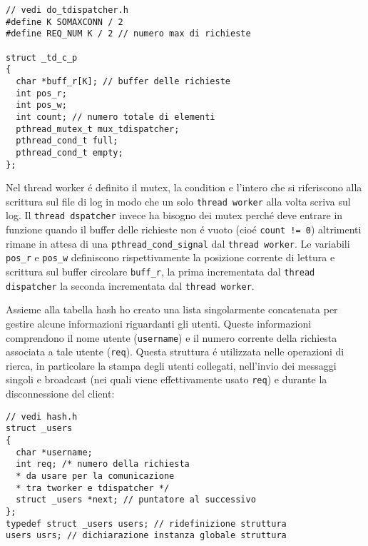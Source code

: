\documentclass[12pt a4paper oneside]{article}
\begin{document}
{\begin{verbatim}
// vedi do_tdispatcher.h
#define K SOMAXCONN / 2
#define REQ_NUM K / 2 // numero max di richieste

struct _td_c_p
{
  char *buff_r[K]; // buffer delle richieste
  int pos_r;
  int pos_w;
  int count; // numero totale di elementi
  pthread_mutex_t mux_tdispatcher;
  pthread_cond_t full;
  pthread_cond_t empty;
};
			\end{verbatim}
			Nel thread worker \'e definito il mutex, la condition e l'intero che si riferiscono alla scrittura sul file di log in modo che un solo \texttt{thread worker} alla volta scriva sul log. Il \texttt{thread dspatcher} invece ha bisogno dei mutex perch\'e deve entrare in funzione quando il buffer delle richieste non \'e vuoto (cio\'e \texttt{count != 0}) altrimenti rimane in attesa di una \texttt{pthread\_cond\_signal} dal \texttt{thread worker}. Le variabili \texttt{pos\_r} e \texttt{pos\_w} definiscono rispettivamente la posizione corrente di lettura e scrittura sul buffer circolare \texttt{buff\_r}, la prima incrementata dal \texttt{thread dispatcher} la seconda incrementata dal \texttt{thread worker}.
			\par
			Assieme alla tabella hash ho creato una lista singolarmente concatenata per gestire alcune informazioni riguardanti gli utenti. Queste informazioni comprendono il nome utente (\texttt{username}) e il numero corrente della richiesta associata a tale utente (\texttt{req}). Questa struttura \'e utilizzata nelle operazioni di rierca, in particolare la stampa degli utenti collegati, nell'invio dei messaggi singoli e broadcast (nei quali viene effettivamente usato \texttt{req}) e durante la disconnessione del client:
			\begin{verbatim}
// vedi hash.h
struct _users
{
  char *username;
  int req; /* numero della richiesta
  * da usare per la comunicazione
  * tra tworker e tdispatcher */
  struct _users *next; // puntatore al successivo
};
typedef struct _users users; // ridefinizione struttura
users usrs; // dichiarazione instanza globale struttura
			\end{verbatim}
		\newpage
}
\end{document}
